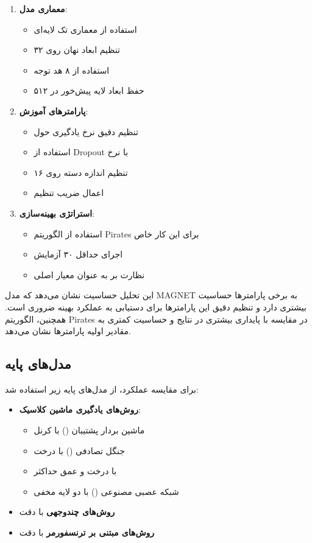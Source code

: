 \begin{enumerate}
    \item \textbf{معماری مدل}:
    \begin{itemize}
        \item استفاده از معماری تک لایه‌ای
        \item تنظیم ابعاد نهان روی ۳۲
        \item استفاده از ۸ هد توجه
        \item حفظ ابعاد لایه پیش‌خور در ۵۱۲
    \end{itemize}
    
    \item \textbf{پارامترهای آموزش}:
    \begin{itemize}
        \item تنظیم دقیق نرخ یادگیری حول 
        \item استفاده از Dropout با نرخ 
        \item تنظیم اندازه دسته روی ۱۶
        \item اعمال ضریب تنظیم 
    \end{itemize}
    
    \item \textbf{استراتژی بهینه‌سازی}:
    \begin{itemize}
        \item استفاده از الگوریتم Pirates برای این کار خاص
        \item اجرای حداقل ۳۰ آزمایش
        \item نظارت بر  به عنوان معیار اصلی
    \end{itemize}
\end{enumerate}

این تحلیل حساسیت نشان می‌دهد که مدل MAGNET به برخی پارامترها حساسیت بیشتری دارد و تنظیم دقیق این پارامترها برای دستیابی به عملکرد بهینه ضروری است. همچنین، الگوریتم Pirates در مقایسه با  پایداری بیشتری در نتایج و حساسیت کمتری به مقادیر اولیه پارامترها نشان می‌دهد.


\subsection{مدل‌های پایه}
برای مقایسه عملکرد، از مدل‌های پایه زیر استفاده شد:
\begin{itemize}
    \item \textbf{روش‌های یادگیری ماشین کلاسیک}:
    \begin{itemize}
        \item ماشین بردار پشتیبان () با کرنل 
        \item جنگل تصادفی () با  درخت
        \item {} با  درخت و عمق حداکثر 
        \item شبکه عصبی مصنوعی () با دو لایه مخفی
    \end{itemize}
    \item \textbf{روش‌های چندوجهی} با دقت  \cite{Alsaleh2023}
    \item \textbf{روش‌های مبتنی بر ترنسفورمر} با دقت  \cite{TransformerMalware}
\end{itemize}

